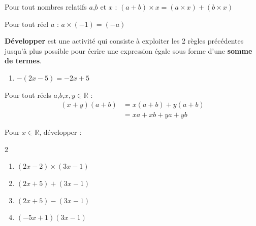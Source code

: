 \documentclass[main.tex]{subfiles}
\begin{document}
\begin{tBox}[frametitle={Règle 1 : Axiome de distributivité}]
	Pour tout nombres relatifs $a$,$b$ et $x$ :  
	$ 	(a+b)\times x = (a\times x)+(b\times x)  	$ 
\end{tBox}
\begin{tBox}[frametitle={Règle 2}] Pour tout réel $a$ :  
	$a \times (-1) = (-a)$
\end{tBox}
\textbf{Développer} est une activité qui consiste à exploiter les 2 règles précédentes jusqu'à plus possible pour écrire une expression égale sous forme d'une \textbf{somme de termes}.
\begin{example}\hfill  
	\begin{enumerate}[label={$\Alph*=$}, leftmargin=*]  
		\item $- (2x-5) = -2x+5   $ 
	\end{enumerate} 
\end{example}  
\begin{tBox}[frametitle={La double distributivité}]
	Pour tout réels $a$,$b$,$x, y\in\mathbb{R}$ : 
	\begin{align*}
		(x + y)(a + b) &= x(a + b) + y(a + b)\\
		& = xa + xb + ya + yb
	\end{align*} 
\end{tBox} 
\begin{example} Pour $x\in \mathbb{R}$, développer :
	\begin{multicols}{2}
		\begin{enumerate}[label={$\Alph*(x)=$},leftmargin=*]
			\item   $(2x-2)\times  (3x-1)$
			\item   $(2x+5)+ (3x-1)$
			\item   $(2x+5)- (3x-1)$
			\item   $(-5x+1)   (3x-1)$
		\end{enumerate}
	\end{multicols}
\end{example}

\newpage 
{}  
\pagestyle{scrheadings} %
\onehalfspacing
\end{document}

